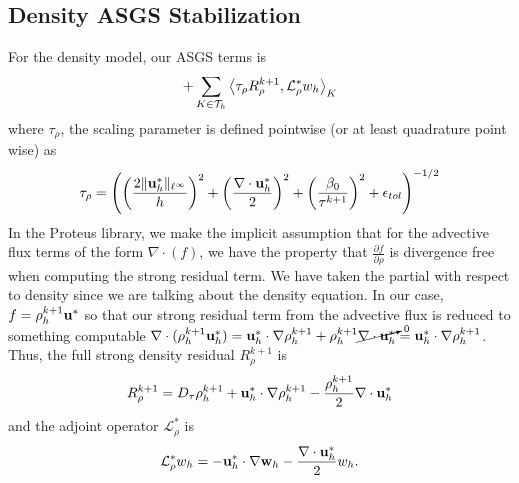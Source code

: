 \documentclass[letterpaper]{erdc}
\begin{document}
\subsection{Density ASGS Stabilization} For the density model, our ASGS terms is
\begin{equation}
  +\displaystyle\sum_{K\in\mathcal{T}_h}\left\langle \tau_{\rho} R_{\rho}^{k+1}, \mathcal{L}_{\rho}^{*} w_h \right\rangle_{K}
\end{equation}
where $\tau_{\rho}$, the scaling parameter is defined pointwise (or at least quadrature point wise) as
\begin{align}
  \tau_{\rho} = \left(\left(\frac{2\|\textbf{u}^{*}_h\|_{\ell^{\infty}}}{h}\right)^2 + \left(\frac{\nabla\cdot \textbf{u}^{*}_h}{2}\right)^2 + \left( \frac{\beta_0}{\tau^{k+1}} \right)^2 + \epsilon_{tol}\right)^{-1/2}
\end{align}
In the Proteus library, we make the implicit assumption that for the advective flux terms of the form $\nabla\cdot(f)$, we have the property that $\frac{\partial f}{\partial\rho}$ is divergence free when computing the strong residual term.  We have taken the partial with respect to density since we are talking about the density equation.  In our case, $f = \rho_h^{k+1}\textbf{u}^{*}$ so that our strong residual term from the advective flux is reduced to something computable $\nabla\cdot(\rho^{k+1}_h\textbf{u}^{*}_h) = \textbf{u}^{*}_h\cdot\nabla\rho_h^{k+1} + \rho^{k+1}_h\cancelto{0}{\nabla\cdot\textbf{u}^{*}_h} = \textbf{u}^{*}_h\cdot\nabla\rho_h^{k+1}$.  Thus, the full strong density residual $R_{\rho}^{k+1}$ is
\begin{equation}
  R_{\rho}^{k+1} = D_\tau \rho^{k+1}_h + \textbf{u}^{*}_h\cdot\nabla\rho_h^{k+1} - \frac{\rho_h^{k+1}}{2}\nabla\cdot\textbf{u}^{*}_h
\end{equation}
and the adjoint operator $\mathcal{L}_{\rho}^{*}$ is
\begin{equation}
  \mathcal{L}_{\rho}^{*} w_h = -\textbf{u}_h^{*}\cdot\nabla\textbf{w}_h -\frac{\nabla\cdot\textbf{u}^{*}_h}{2} w_h.
\end{equation}
\end{document}
